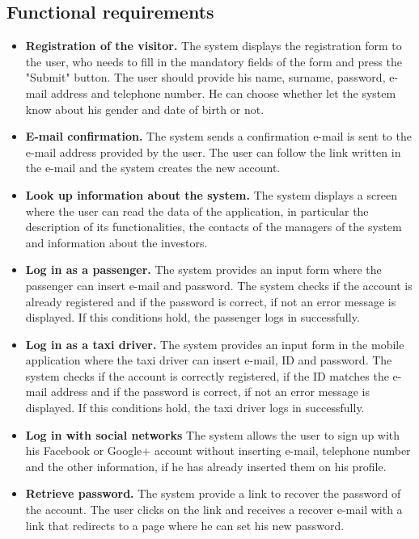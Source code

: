\documentclass[18pt,oneside,a4paper, titlepage]{article}
\begin{document}
	\subsection{Functional requirements}
		\begin{itemize}
			\item \textbf{Registration of the visitor.}
				The system displays the registration form to the user, who needs to fill in the mandatory fields of the form and press the "Submit" button. The user should provide his name, surname, password, e-mail address and telephone number. He can choose whether let the system know about his gender and date of birth or not.
			
			\item \textbf{E-mail confirmation.}
				The system sends a confirmation e-mail is sent to the e-mail address provided by the user. The user can follow the link written in the e-mail and the system creates the new account.
				
			\item \textbf{Look up information about the system.}
				The system displays a screen where the user can read the data of the application, in particular the description of its functionalities, the contacts of the managers of the system and information about the investors.
				
			\item \textbf{Log in as a passenger.}
				The system provides an input form where the passenger can insert e-mail and password. The system checks if the account is already registered and if the password is correct, if not an error message is displayed. If this conditions hold, the passenger logs in successfully.
				
			\item \textbf{Log in as a taxi driver.}
				The system provides an input form in the mobile application where the taxi driver can insert e-mail, ID and password. The system checks if the account is correctly registered, if the ID matches the e-mail address and if the password is correct, if not an error message is displayed. If this conditions hold, the taxi driver logs in successfully.
				
			\item \textbf{Log in with social networks}
				The system allows the user to sign up with his Facebook or Google+ account without inserting e-mail, telephone number and the other information, if he has already inserted them on his profile.
				
			\item \textbf{Retrieve password.}
				The system provide a link to recover the password of the account. The user clicks on the link and receives a recover e-mail with a link that redirects to a page where he can set his new password.
				

\end{itemize}
\end{document}
